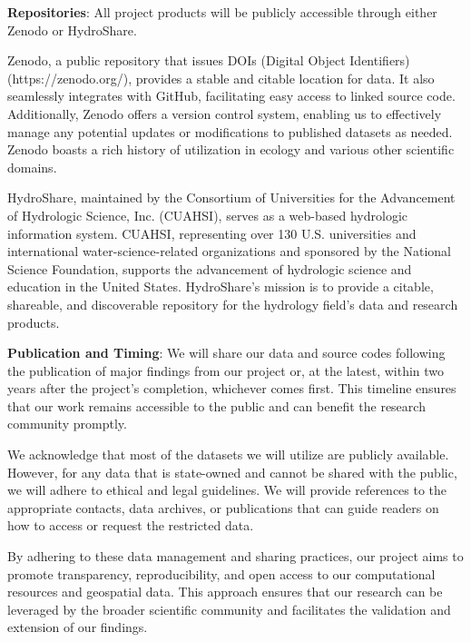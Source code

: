 \documentclass[12pt, class=article, crop=false]{standalone}
\begin{document}
\textbf{Repositories}: All project products will be publicly accessible through either Zenodo or HydroShare.

Zenodo, a public repository that issues DOIs (Digital Object Identifiers) (https://zenodo.org/), provides a stable and citable location for data.
It also seamlessly integrates with GitHub, facilitating easy access to linked source code.
Additionally, Zenodo offers a version control system, enabling us to effectively manage any potential updates or modifications to published datasets as needed. Zenodo boasts a rich history of utilization in ecology and various other scientific domains.

HydroShare, maintained by the Consortium of Universities for the Advancement of Hydrologic Science, Inc. (CUAHSI), serves as a web-based hydrologic information system. CUAHSI, representing over 130 U.S. universities and international water-science-related organizations and sponsored by the National Science Foundation, supports the advancement of hydrologic science and education in the United States. HydroShare's mission is to provide a citable, shareable, and discoverable repository for the hydrology field's data and research products.

\textbf{Publication and Timing}: We will share our data and source codes following the publication of major findings from our project or, at the latest, within two years after the project's completion, whichever comes first.
This timeline ensures that our work remains accessible to the public and can benefit the research community promptly.

We acknowledge that most of the datasets we will utilize are publicly available. However, for any data that is state-owned and cannot be shared with the public, we will adhere to ethical and legal guidelines. We will provide references to the appropriate contacts, data archives, or publications that can guide readers on how to access or request the restricted data.

By adhering to these data management and sharing practices, our project aims to promote transparency, reproducibility, and open access to our computational resources and geospatial data. This approach ensures that our research can be leveraged by the broader scientific community and facilitates the validation and extension of our findings.
\end{document}
